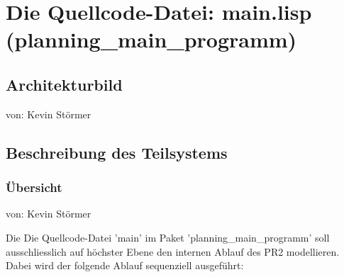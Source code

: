 \documentclass{suturo}
\begin{document}

\makeatletter
\newcommand{\chapterauthor}[1]{%
  {\parindent0pt\vspace*{-27pt}%
  \linespread{0}\small\begin{flushright}von: #1\end{flushright}%
  \par\nobreak\vspace*{0pt}}
  \@afterheading%
}
\makeatother


\section{Die Quellcode-Datei: main.lisp (planning\_main\_programm)}
\subsection{Architekturbild}
\chapterauthor{Kevin Störmer}


\begin{figure}[!htb]
\end{figure}
      


\subsection{Beschreibung des Teilsystems}
\subsubsection{\"Ubersicht}\label{sec:main}
\chapterauthor{Kevin Störmer}
Die Die Quellcode-Datei 'main' im Paket 'planning\_main\_programm' soll ausschliesslich auf höchster Ebene den internen Ablauf des PR2 modellieren. Dabei wird der folgende Ablauf sequenziell ausgef\"uhrt:\\
\end{document}
